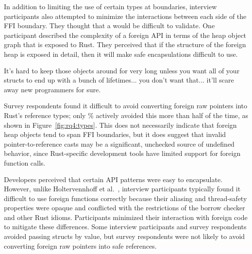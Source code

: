 In addition to limiting the use of certain types at boundaries, interview participants also attempted to minimize the interactions between each side of the FFI boundary. They thought that a  would be difficult to validate. One participant described the complexity of a foreign API in terms of the heap object graph that is exposed to Rust. They perceived that if the structure of the foreign heap is exposed in detail, then it will make safe encapsulations difficult to use.

\begin{pquote}{14}
It's hard to keep those objects around for very long unless you want all of your structs to end up with a bunch of lifetimes...
you don't want that...
it'll scare away new programmers for sure.
\end{pquote}
Survey respondents found it difficult to avoid converting foreign raw pointers into Rust's reference types; only \avoidedrawasref\% actively avoided this more than half of the time, as shown in Figure~\ref{fig:rq4:types}. This does not necessarily indicate that foreign heap objects tend to span FFI boundaries, but it does suggest that invalid pointer-to-reference casts may be a significant, unchecked source of undefined behavior, since Rust-specific development tools have limited support for foreign function calls. 

\rsqfour 
Developers perceived that certain API patterns were easy to encapsulate. However, unlike Holtervennhoff et al.~\cite{holtervennhoff23}, interview participants typically found it difficult to use foreign functions correctly because their aliasing and thread-safety properties were opaque and conflicted with the restrictions of the borrow checker and other Rust idioms. Participants minimized their interaction with foreign code to mitigate these differences. Some interview participants and survey respondents avoided passing structs by value, but survey respondents were not likely to avoid converting foreign raw pointers into safe references. 